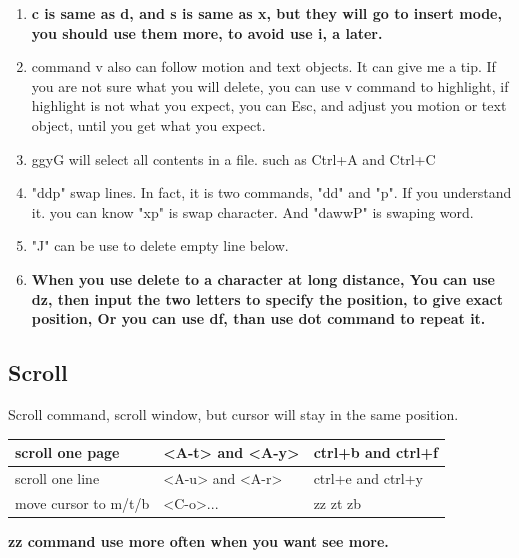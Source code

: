 \documentclass[paper=8.5in:11in, twoside, 12pt, pagesize=pdftex]{book}
\begin{document}
\begin{enumerate}
			\item \textbf{c is same as d, and s is same as x, but they will go to insert mode, you should use them more, to avoid use i, a later.}  
			
			\item command v also can follow motion and text objects. It can give me a tip. If you are not sure what you will delete, you can use v command to highlight, if highlight is not what you expect, you can Esc, and adjust you motion or text object, until you get what you expect. 
			
			\item ggyG will select all contents in a file. such as Ctrl+A and Ctrl+C 
			
			\item "ddp" swap lines. In fact, it is two commands, "dd" and "p". If you understand it. you can know "xp" is swap character. And "dawwP" is swaping word.
			
			\item "J" can be use to delete empty line below.
			
			\item \textbf{When you use delete to a character at long distance, You can use dz, then input the two letters to specify the position, to give exact position, Or you can use df, than use dot command to repeat it. }
		\end{enumerate}

	
	\subsection{Scroll}
Scroll command, scroll window, but cursor will stay in the same position.
		\begin{center}
			\begin{tabular}{p{0.25\textwidth}|p{}|p{}}
				\hline
				scroll one  page &  <A-t> and <A-y>  & ctrl+b and  ctrl+f    \\
				
				\hline 		  
				scroll one line &  <A-u> and <A-r>  & ctrl+e and ctrl+y \\
				
				\hline 		  
				move cursor to m/t/b & <C-o>...    & zz zt zb \\
				\hline
			\end{tabular}
		\end{center}
		
		\textbf{zz command use more often when you want see more.}
		
\end{document}
